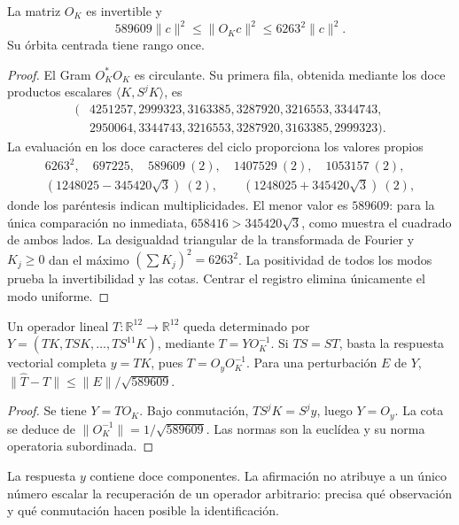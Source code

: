 \begin{theorem}
\label{thm:acoplamiento-orbita}
La matriz \(O_K\) es invertible y
\[
 589609\|c\|^2\leq\|O_Kc\|^2\leq6263^2\|c\|^2.
\]
Su órbita centrada tiene rango once.
\end{theorem}
\begin{proof}
El Gram \(O_K^*O_K\) es circulante. Su primera fila, obtenida mediante
los doce productos escalares \(\langle K,S^jK\rangle\), es
\[
 \begin{aligned}
 (&4251257,2999323,3163385,3287920,3216553,3344743,\\
  &2950064,3344743,3216553,3287920,3163385,2999323).
 \end{aligned}
\]
La evaluación en los doce caracteres del ciclo proporciona los valores
propios
\[
 \begin{gathered}
 6263^2,\quad697225,\quad
 589609\ (2),\quad1407529\ (2),\quad1053157\ (2),\\
 (1248025-345420\sqrt3)\ (2),\qquad
 (1248025+345420\sqrt3)\ (2),
 \end{gathered}
\]
donde los paréntesis indican multiplicidades. El menor valor es
\(589609\): para la única comparación no inmediata,
\(658416>345420\sqrt3\), como muestra el cuadrado de ambos lados.
La desigualdad triangular de la transformada de Fourier y \(K_j\geq0\)
dan el máximo \((\sum K_j)^2=6263^2\).
La positividad de todos los modos prueba la invertibilidad y las cotas.
Centrar el registro elimina únicamente el modo uniforme.
\end{proof}

\begin{corollary}
\label{cor:acoplamiento-identificacion}
Un operador lineal \(T:\mathbb R^{12}\to\mathbb R^{12}\) queda determinado por
\(Y=(TK,TSK,\ldots,TS^{11}K)\), mediante \(T=YO_K^{-1}\).
Si \(TS=ST\), basta la respuesta vectorial completa \(y=TK\), pues
\(T=O_yO_K^{-1}\). Para una perturbación \(E\) de \(Y\),
\(\|\widehat T-T\|\leq\|E\|/\sqrt{589609}\).
\end{corollary}
\begin{proof}
Se tiene \(Y=TO_K\). Bajo conmutación, \(TS^jK=S^jy\), luego \(Y=O_y\).
La cota se deduce de
\(\|O_K^{-1}\|=1/\sqrt{589609}\).
Las normas son la euclídea y su norma operatoria subordinada.
\end{proof}

La respuesta \(y\) contiene doce componentes. La afirmación no atribuye
a un único número escalar la recuperación de un operador arbitrario:
precisa qué observación y qué conmutación hacen posible la identificación.

